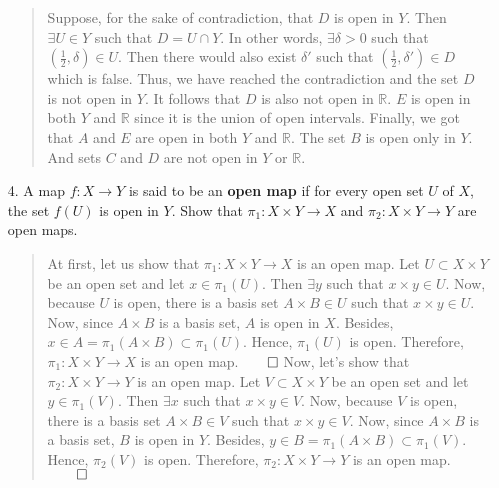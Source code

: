 \documentclass[12pt, a4paper]{article}
\newcommand{\reals}{\mathbb{R}} %
\newcommand{\rarr}{\rightarrow}
\begin{document}
\begin{itemize}
\begin{quote}
Suppose, for the sake of contradiction, that $D$ is open in $Y$.
Then $\exists U \in Y$ such that $D = U \cap Y$. In other words,
$\exists \delta > 0$ such that $(\frac{1}{2}, \delta) \in U$.
Then there would also exist $\delta\prime$ such that $(\frac{1}{2}, \delta\prime) \in D$
which is false. Thus, we have reached the contradiction and the set $D$
is not open in $Y$. It follows that $D$ is also not open in $\reals$.
\newline
\newline
$E$ is open in both $Y$ and $\reals$ since it is the union of open intervals.
\newline
\newline
Finally, we got that $A$ and $E$ are open in both $Y$ and $\reals$.
The set $B$ is open only in $Y$. And sets $C$ and $D$ are not open in $Y$ or $\reals$.
\end{quote}

\item[]
\item[]

\item[4.]
A map $f : X \rarr Y$ is said to be an \textbf{open map} if for every open set $U$ of $X$,
the set $f(U)$ is open in $Y$. Show that $\pi_1 : X \times Y \rarr X$ and $\pi_2 : X \times Y \rarr Y$ are open maps.
\begin{quote}
At first, let us show that $\pi_1 : X \times Y \rarr X$ is an open map.
Let $U \subset X \times Y$ be an open set and let $x \in \pi_1(U)$. Then $\exists y$ such that $x \times y \in U$.
Now, because $U$ is open, there is a basis set $A \times B \in U$ such that $x \times y \in U$.
Now, since $A \times B$ is a basis set, $A$ is open in $X$. Besides, $x \in A = \pi_1(A \times B) \subset \pi_1(U)$.
Hence, $\pi_1(U)$ is open. Therefore, $\pi_1 : X \times Y \rarr X$ is an open map.$\qed$
\newline
\newline
Now, let's show that $\pi_2 : X \times Y \rarr Y$ is an open map.
Let $V \subset X \times Y$ be an open set and let $y \in \pi_1(V)$. Then $\exists x$ such that $x \times y \in V$.
Now, because $V$ is open, there is a basis set $A \times B \in V$ such that $x \times y \in V$.
Now, since $A \times B$ is a basis set, $B$ is open in $Y$. Besides, $y \in B = \pi_1(A \times B) \subset \pi_1(V)$.
Hence, $\pi_2(V)$ is open. Therefore, $\pi_2 : X \times Y \rarr Y$ is an open map.$\qed$
\end{quote}

\item[]
\item[]


\end{itemize}
\end{document}
